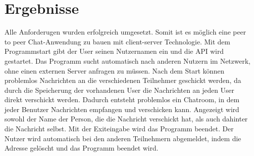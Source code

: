 \section{Ergebnisse}
Alle Anforderugen wurden erfolgreich umgesetzt. 
Somit ist es möglich eine peer to peer Chat-Anwendung zu bauen mit client-server Technologie.
Mit dem Programmstart gibt der User seinen Nutzernamen ein und die API wird gestartet. 
Das Programm sucht automatisch nach anderen Nutzern im Netzwerk, ohne einen externen Server anfragen zu müssen.
Nach dem Start können problemlos Nachrichten an die verschiedenen Teilnehmer geschickt werden, da durch die Speicherung der vorhandenen User die Nachrichten an jeden User direkt verschickt werden.
Dadurch entsteht problemlos ein Chatroom, in dem jeder Benutzer Nachrichten empfangen und verschicken kann. 
Angezeigt wird sowohl der Name der Person, die die Nachricht verschickt hat, als auch dahinter die Nachricht selbst. 
Mit der Exiteingabe wird das Programm beendet. Der Nutzer wird automatisch bei den anderen Teilnehmern abgemeldet, indem die Adresse gelöscht und das Programm beendet wird.